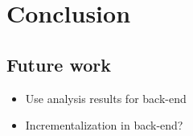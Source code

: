 
\chapter{\label{chap:conclusion}Conclusion}

  \section{Future work}

    \begin{itemize}
      \item Use analysis results for back-end
      \item Incrementalization in back-end?
    \end{itemize}
